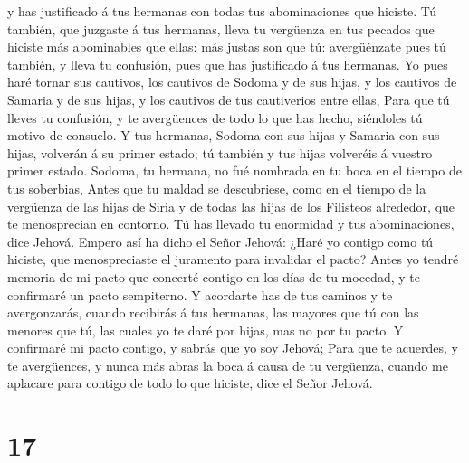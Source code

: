 y has justificado á tus hermanas con todas tus abominaciones que
hiciste.  Tú también, que juzgaste á tus hermanas, lleva tu
vergüenza en tus pecados que hiciste más abominables que ellas: más
justas son que tú: avergüénzate pues tú también, y lleva tu confusión,
pues que has justificado á tus hermanas.  Yo pues haré
tornar sus cautivos, los cautivos de Sodoma y de sus hijas, y los
cautivos de Samaria y de sus hijas, y los cautivos de tus cautiverios
entre ellas,  Para que tú lleves tu confusión, y te
avergüences de todo lo que has hecho, siéndoles tú motivo de consuelo.
 Y tus hermanas, Sodoma con sus hijas y Samaria con sus
hijas, volverán á su primer estado; tú también y tus hijas volveréis á
vuestro primer estado.  Sodoma, tu hermana, no fué nombrada
en tu boca en el tiempo de tus soberbias,  Antes que tu
maldad se descubriese, como en el tiempo de la vergüenza de las hijas de
Siria y de todas las hijas de los Filisteos alrededor, que te
menosprecian en contorno.  Tú has llevado tu enormidad y
tus abominaciones, dice Jehová.  Empero así ha dicho el
Señor Jehová: ¿Haré yo contigo como tú hiciste, que menospreciaste el
juramento para invalidar el pacto?  Antes yo tendré memoria
de mi pacto que concerté contigo en los días de tu mocedad, y te
confirmaré un pacto sempiterno.  Y acordarte has de tus
caminos y te avergonzarás, cuando recibirás á tus hermanas, las mayores
que tú con las menores que tú, las cuales yo te daré por hijas, mas no
por tu pacto.  Y confirmaré mi pacto contigo, y sabrás que
yo soy Jehová;  Para que te acuerdes, y te avergüences, y
nunca más abras la boca á causa de tu vergüenza, cuando me aplacare para
contigo de todo lo que hiciste, dice el Señor Jehová.

\hypertarget{section-16}{%
\section{17}\label{section-16}}

